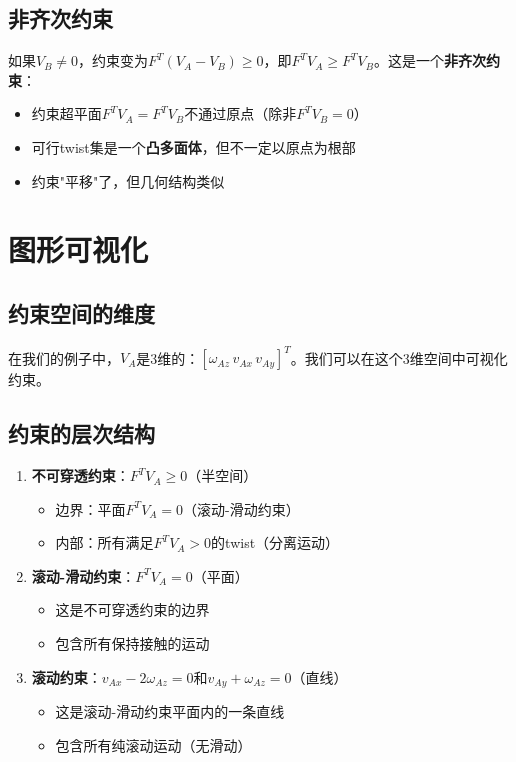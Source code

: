 \documentclass[12pt,a4paper]{article}
\begin{document}
\subsection{非齐次约束}

如果$V_B \neq 0$，约束变为$F^T (V_A - V_B) \geq 0$，即$F^T V_A \geq F^T V_B$。这是一个\textbf{非齐次约束}：

\begin{itemize}
\item 约束超平面$F^T V_A = F^T V_B$不通过原点（除非$F^T V_B = 0$）
\item 可行twist集是一个\textbf{凸多面体}，但不一定以原点为根部
\item 约束"平移"了，但几何结构类似
\end{itemize}

\section{图形可视化}

\subsection{约束空间的维度}

在我们的例子中，$V_A$是3维的：$[\omega_{Az} \, v_{Ax} \, v_{Ay}]^T$。我们可以在这个3维空间中可视化约束。

\subsection{约束的层次结构}

\begin{enumerate}
\item \textbf{不可穿透约束}：$F^T V_A \geq 0$（半空间）
   \begin{itemize}
   \item 边界：平面$F^T V_A = 0$（滚动-滑动约束）
   \item 内部：所有满足$F^T V_A > 0$的twist（分离运动）
   \end{itemize}

\item \textbf{滚动-滑动约束}：$F^T V_A = 0$（平面）
   \begin{itemize}
   \item 这是不可穿透约束的边界
   \item 包含所有保持接触的运动
   \end{itemize}

\item \textbf{滚动约束}：$v_{Ax} - 2\omega_{Az} = 0$和$v_{Ay} + \omega_{Az} = 0$（直线）
   \begin{itemize}
   \item 这是滚动-滑动约束平面内的一条直线
   \item 包含所有纯滚动运动（无滑动）
   \end{itemize}
\end{enumerate}
\end{document}
